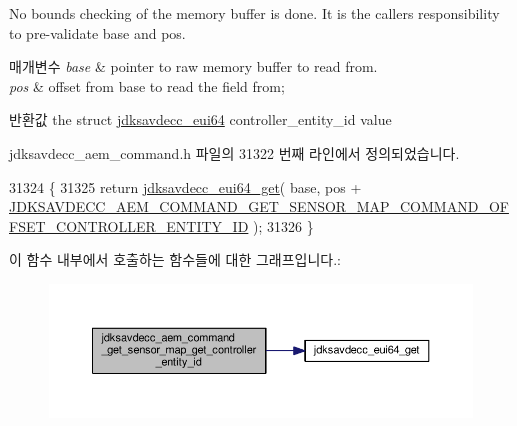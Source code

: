 No bounds checking of the memory buffer is done. It is the caller\textquotesingle{}s responsibility to pre-\/validate base and pos.


\begin{DoxyParams}{매개변수}
{\em base} & pointer to raw memory buffer to read from. \\
\hline
{\em pos} & offset from base to read the field from; \\
\hline
\end{DoxyParams}
\begin{DoxyReturn}{반환값}
the struct \hyperlink{structjdksavdecc__eui64}{jdksavdecc\+\_\+eui64} controller\+\_\+entity\+\_\+id value 
\end{DoxyReturn}


jdksavdecc\+\_\+aem\+\_\+command.\+h 파일의 31322 번째 라인에서 정의되었습니다.


\begin{DoxyCode}
31324 \{
31325     \textcolor{keywordflow}{return} \hyperlink{group__eui64_ga2652311a25a6b91cddbed75c108c7031}{jdksavdecc\_eui64\_get}( base, pos + 
      \hyperlink{group__command__get__sensor__map_gaa9a59eb95c2f583d5b3abeebe3a434fd}{JDKSAVDECC\_AEM\_COMMAND\_GET\_SENSOR\_MAP\_COMMAND\_OFFSET\_CONTROLLER\_ENTITY\_ID}
       );
31326 \}
\end{DoxyCode}


이 함수 내부에서 호출하는 함수들에 대한 그래프입니다.\+:
\nopagebreak
\begin{figure}[H]
\begin{center}
\leavevmode
\includegraphics[width=350pt]{group__command__get__sensor__map_gaec1508a93b57a9b5f0b57fc4a241ec33_cgraph}
\end{center}
\end{figure}


